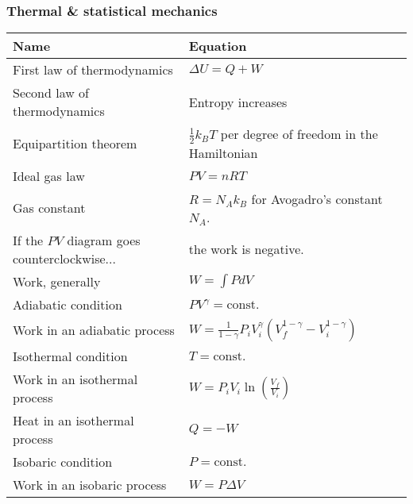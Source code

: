 \documentclass[11pt]{paper}
\begin{document}
\subsubsection*{Thermal \& statistical mechanics}
\label{subsec:tsm}
\label{my-label}
\bgroup
\def\arraystretch{2}
\begin{longtable}{ll}
\textbf{Name}       & \textbf{Equation}          \\ \hline
\multicolumn{1}{|l|}{First law of thermodynamics} & \multicolumn{1}{l|}{$\Delta U = Q+W$} \\ \hline
\multicolumn{1}{|l|}{Second law of thermodynamics} & \multicolumn{1}{l|}{Entropy increases} \\ \hline
\multicolumn{1}{|l|}{Equipartition theorem} & \multicolumn{1}{l|}{$\frac{1}{2}k_BT$ per degree of freedom in the Hamiltonian} \\ \hline
\multicolumn{1}{|l|}{Ideal gas law} & \multicolumn{1}{l|}{$PV=nRT$} \\ \hline
\multicolumn{1}{|l|}{Gas constant} & \multicolumn{1}{l|}{$R = N_A k_B$ for Avogadro's constant $N_A$.} \\ \hline
\multicolumn{1}{|l|}{If the $PV$ diagram goes counterclockwise...} & \multicolumn{1}{l|}{the work is negative.} \\ \hline
\multicolumn{1}{|l|}{Work, generally} & \multicolumn{1}{l|}{$W = \int P dV$} \\ \hline
\multicolumn{1}{|l|}{Adiabatic condition} & \multicolumn{1}{l|}{$PV^\gamma = \text{const.}$} \\ \hline
\multicolumn{1}{|l|}{Work in an adiabatic process} & \multicolumn{1}{l|}{$W = \frac{1}{1-\gamma}P_i V_i^{\gamma}\left(V_f^{1-\gamma}-V_i^{1-\gamma}\right)$} \\ \hline
\multicolumn{1}{|l|}{Isothermal condition} & \multicolumn{1}{l|}{$T = \text{const.}$} \\ \hline
\multicolumn{1}{|l|}{Work in an isothermal process} & \multicolumn{1}{l|}{$W = P_iV_i\ln\left(\frac{V_f}{V_i}\right)$} \\ \hline
\multicolumn{1}{|l|}{Heat in an isothermal process} & \multicolumn{1}{l|}{$Q = -W$} \\ \hline
\multicolumn{1}{|l|}{Isobaric condition} & \multicolumn{1}{l|}{$P = \text{const.}$} \\ \hline
\multicolumn{1}{|l|}{Work in an isobaric process} & \multicolumn{1}{l|}{$W = P\Delta V$} \\ \hline

\end{longtable}
\end{document}
